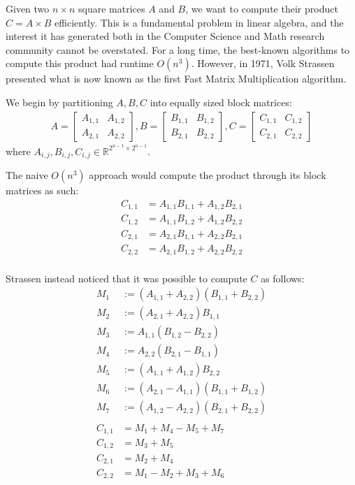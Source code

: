 \documentclass{common/cs157}
\begin{document}
\homeworkhandin 

\begin{problem}{1}
Given two $n \times n$ square matrices $A$ and $B$, we want to compute their product $C = A \times B$ efficiently. This is a fundamental problem in linear algebra, and the interest it has generated both in the Computer Science and Math research community cannot be overstated. 
For a long time, the best-known algorithms to compute this product had runtime $O(n^3)$. However, in 1971, Volk Strassen presented what is now known as the first Fast Matrix Multiplication algorithm.

We begin by partitioning $A, B, C$ into equally sized block matrices:
\begin{align*}
    A = \begin{bmatrix} A_{1, 1} & A_{1, 2} \\ A_{2, 1} & A_{2, 2} \end{bmatrix},
    B = \begin{bmatrix} B_{1, 1} & B_{1, 2} \\ B_{2, 1} & B_{2, 2} \end{bmatrix},
    C = \begin{bmatrix} C_{1, 1} & C_{1, 2} \\ C_{2, 1} & C_{2, 2} \end{bmatrix}
\end{align*}
where $A_{i, j}, B_{i, j}, C_{i, j} \in \mathbb{R}^{2^{n-1} \times 2^{n-1}}$.

The naive $O(n^3)$ approach would compute the product through its block matrices as such:
\begin{align*}
    C_{1, 1} &= A_{1, 1}B_{1, 1} + A_{1, 2}B_{2, 1} \\
    C_{1, 2} &= A_{1, 1}B_{1, 2} + A_{1, 2}B_{2, 2} \\ 
    C_{2, 1} &= A_{2, 1}B_{1, 1} + A_{2, 2}B_{2, 1} \\ 
    C_{2, 2} &= A_{2, 1}B_{1, 2} + A_{2, 2}B_{2, 2} \\ 
\end{align*}

Strassen instead noticed that it was possible to compute $C$ as follows:
\begin{align*}
    M_1 &:= (A_{1, 1} + A_{2, 2})(B_{1, 1} + B_{2, 2}) \\
    M_2 &:= (A_{2, 1} + A_{2, 2})B_{1, 1} \\
    M_3 &:= A_{1, 1}(B_{1, 2} - B_{2, 2}) \\
    M_4 &:= A_{2, 2}(B_{2, 1} - B_{1 ,1}) \\
    M_5 &:= (A_{1, 1} + A_{1, 2})B_{2, 2} \\
    M_6 &:= (A_{2, 1} - A_{1, 1})(B_{1, 1} + B_{1, 2}) \\
    M_7 &:= (A_{1, 2} - A_{2, 2})(B_{2, 1} + B_{2, 2}) \\ \\
    C_{1, 1} &= M_1 + M_4 - M_5 + M_7 \\
    C_{1, 2} &= M_3 + M_5 \\ 
    C_{2, 1} &= M_2 + M_4 \\ 
    C_{2, 2} &= M_1 - M_2 + M_3 + M_6 \\ 
\end{align*}
 

\end{problem}
\end{document}
